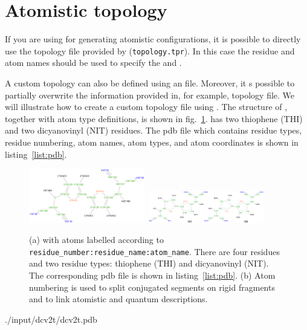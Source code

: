 \section{Atomistic topology}
\label{sec:atomistic}

If you are using \gromacs for generating atomistic configurations, it is possible to directly use the topology file provided by \gromacs (\texttt{topology.tpr}). In this case the \gromacs residue and atom names should be used to specify the  and . 

A custom topology can also be defined using an \xml file. Moreover, it s possible to partially overwrite the information provided in, for example, \gromacs topology file. We will illustrate how to create a custom topology file using \dcvt. The structure of \dcvt, together with atom type definitions, is shown in fig.~\ref{fig:dcv2t}. \dcvt has two thiophene (THI) and two dicyanovinyl (NIT) residues. The pdb file which contains residue types, residue numbering, atom names, atom types, and atom coordinates is shown in listing~\ref{list:pdb}.

\begin{figure}[ht]
\centering
\includegraphics[width=0.45\textwidth]{./fig/chemical_structure/dcv2t_atom_types}\,
\includegraphics[width=0.45\textwidth]{./fig/chemical_structure/dcv2t_gaussian}
\caption{\small (a) \dcvt with atoms labelled according to \texttt{residue\_number:residue\_name:atom\_name}. There are four residues and two residue types: thiophene (THI) and dicyanovinyl (NIT). The corresponding pdb file is shown in listing~\ref{list:pdb}. (b) Atom numbering is used to split conjugated segments on rigid fragments and to link atomistic and quantum descriptions.}
\label{fig:dcv2t}
\end{figure}

%
{./input/dcv2t/dcv2t.pdb}

